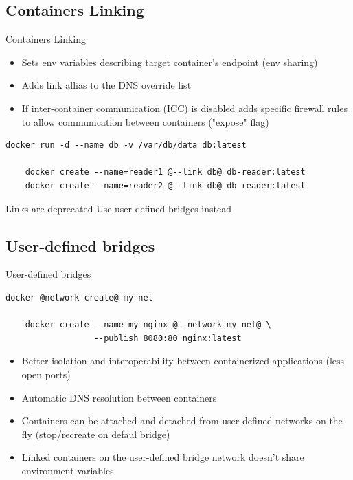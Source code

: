 \subsection{Containers Linking}

\begin{frame}[fragile]{Containers Linking}
  \begin{itemize}
    \item Sets env variables describing target container's endpoint (env sharing)
    \item Adds link allias to the DNS override list
    \item If inter-container communication (ICC) is disabled adds specific firewall rules to allow communication between containers ("expose" flag)    
  \end{itemize}  
  \begin{lstlisting}[basicstyle=\ttfamily\tiny\color{myblue},frame=single]
    docker run -d --name db -v /var/db/data db:latest
    
    docker create --name=reader1 @--link db@ db-reader:latest
    docker create --name=reader2 @--link db@ db-reader:latest
  \end{lstlisting}  
  \begin{alertblock}{Links are deprecated}
  Use user-defined bridges instead
  \end{alertblock}
\end{frame}

\subsection{User-defined bridges}

\begin{frame}[fragile]{User-defined bridges}  
  \begin{lstlisting}[basicstyle=\ttfamily\small\color{myblue}]
    docker @network create@ my-net
    
    docker create --name my-nginx @--network my-net@ \
                  --publish 8080:80 nginx:latest
  \end{lstlisting} 
  \begin{itemize}
    \item Better isolation and interoperability between containerized applications (less open ports)
    \item Automatic DNS resolution between containers
    \item Containers can be attached and detached from user-defined networks on the fly (stop/recreate on defaul bridge)
    \item Linked containers on the user-defined bridge network doesn't share environment variables
  \end{itemize}  
\end{frame}

